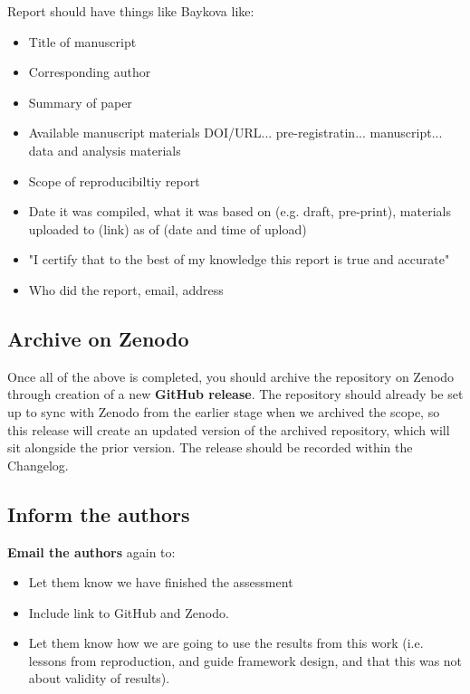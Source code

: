 Report should have things like Baykova \autocite{baykova_ensuring_2024} like:
\begin{itemize}
    \item Title of manuscript
    \item Corresponding author
    \item Summary of paper
    \item Available manuscript materials DOI/URL... pre-registratin... manuscript... data and analysis materials
    \item Scope of reproducibiltiy report
    \item Date it was compiled, what it was based on (e.g. draft, pre-print), materials uploaded to (link) as of (date and time of upload)
    \item "I certify that to the best of my knowledge this report is true and accurate"
    \item Who did the report, email, address
\end{itemize}

\subsection{Archive on Zenodo}

Once all of the above is completed, you should archive the repository on Zenodo through creation of a new \textbf{GitHub release}. The repository should already be set up to sync with Zenodo from the earlier stage when we archived the scope, so this release will create an updated version of the archived repository, which will sit alongside the prior version. The release should be recorded within the Changelog.

\vspace{0.5cm}
\subsection{Inform the authors}

\textbf{Email the authors} again to:
\begin{itemize}
    \item Let them know we have finished the assessment
    \item Include link to GitHub and Zenodo.
    \item Let them know how we are going to use the results from this work (i.e. lessons from reproduction, and guide framework design, and that this was not about validity of results).
\end{itemize}